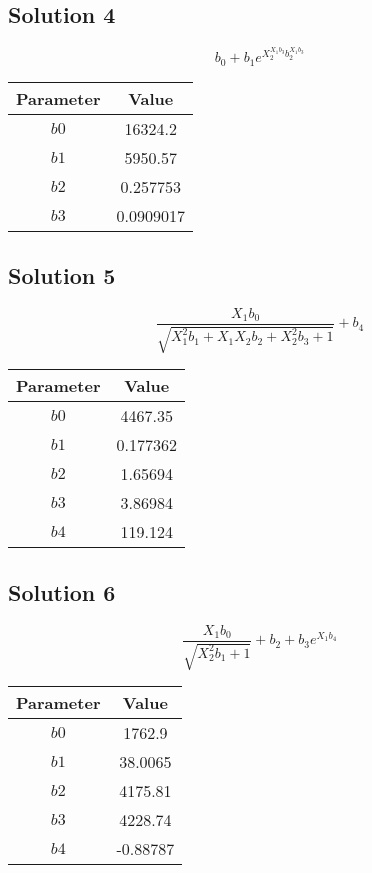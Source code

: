 \documentclass{article}
\begin{document}
\subsection*{Solution 4}
\[
b_{0} + b_{1} e^{X_{2}^{X_{1} b_{3}} b_{2}^{X_{1} b_{3}}}
\]
\begin{center}
\begin{tabular}{cc}
\toprule
Parameter & Value \\
\midrule
$b0$ & 16324.2 \\
$b1$ & 5950.57 \\
$b2$ & 0.257753 \\
$b3$ & 0.0909017 \\
\bottomrule
\end{tabular}
\end{center}

\vspace{1em}
\subsection*{Solution 5}
\[
\frac{X_{1} b_{0}}{\sqrt{X_{1}^{2} b_{1} + X_{1} X_{2} b_{2} + X_{2}^{2} b_{3} + 1}} + b_{4}
\]
\begin{center}
\begin{tabular}{cc}
\toprule
Parameter & Value \\
\midrule
$b0$ & 4467.35 \\
$b1$ & 0.177362 \\
$b2$ & 1.65694 \\
$b3$ & 3.86984 \\
$b4$ & 119.124 \\
\bottomrule
\end{tabular}
\end{center}

\vspace{1em}
\subsection*{Solution 6}
\[
\frac{X_{1} b_{0}}{\sqrt{X_{2}^{2} b_{1} + 1}} + b_{2} + b_{3} e^{X_{1} b_{4}}
\]
\begin{center}
\begin{tabular}{cc}
\toprule
Parameter & Value \\
\midrule
$b0$ & 1762.9 \\
$b1$ & 38.0065 \\
$b2$ & 4175.81 \\
$b3$ & 4228.74 \\
$b4$ & -0.88787 \\
\bottomrule
\end{tabular}
\end{center}
\end{document}
